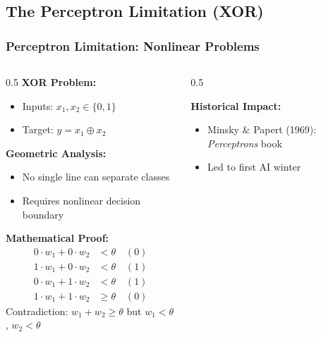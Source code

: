 \documentclass[5pt,aspectratio=169]{beamer}
\begin{document}
\subsection{The Perceptron Limitation (XOR)}
\begin{frame}
\frametitle{Perceptron Limitation: Nonlinear Problems}

\begin{columns}[T]
\begin{column}{0.5\textwidth}
\textbf{XOR Problem:}
\begin{itemize}
\item Inputs: \(x_1, x_2 \in \{0,1\}\)
\item Target: \(y = x_1 \oplus x_2\)
\end{itemize}

\textbf{Geometric Analysis:}
\begin{itemize}
\item No single line can separate classes
\item Requires nonlinear decision boundary
\end{itemize}

\textbf{Mathematical Proof:}
\begin{align*}
0\cdot w_1 + 0\cdot w_2 &< \theta \quad (0) \\
1\cdot w_1 + 0\cdot w_2 &< \theta \quad (1) \\
0\cdot w_1 + 1\cdot w_2 &< \theta \quad (1) \\
1\cdot w_1 + 1\cdot w_2 &\geq \theta \quad (0)
\end{align*}
Contradiction: \(w_1 + w_2 \geq \theta\) but \(w_1 < \theta\), \(w_2 < \theta\)
\end{column}

\begin{column}{0.5\textwidth}

\textbf{Historical Impact:}
\begin{itemize}
\item Minsky \& Papert (1969): \textit{Perceptrons} book
\item Led to first AI winter
\end{itemize}
\end{column}
\end{columns}
\end{frame}
\end{document}
